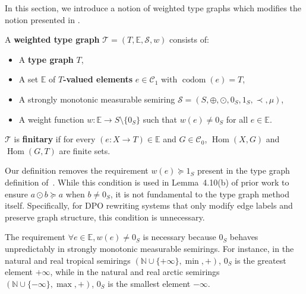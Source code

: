 In this section, we introduce a notion of weighted type graphs which modifies the notion presented in \cite{endrullis2024generalized}.

\begin{definition}
    \label{def:weighted_type_graph}
    A \textbf{weighted type graph} \(\mathcal{T} = (T, \mathbb{E}, \mathcal{S}, w)\) consists of:
    \begin{itemize}
        \item A \textbf{type graph} \(T\),
        \item A set \(\mathbb{E}\) of \textbf{\(T\)-valued elements} \(e \in \mathcal{C}_1\) with $\operatorname{codom}(e) = T$,
        \item A strongly monotonic measurable semiring \(\mathcal{S}=(S, \oplus, \odot, 0_S, 1_S, \prec, \mu)\),
        \item A weight function \(w : \mathbb{E} \to S \setminus \{0_S\}\) such that \(w(e) \neq 0_S\) for all \(e \in \mathbb{E}\).
    \end{itemize}
    \(\mathcal{T}\) is \textbf{finitary} if for every \((e:X \to T) \in \mathbb{E}\) and \(G \in \mathcal{C}_0\), \(\operatorname{Hom}(X, G)\) and \(\operatorname{Hom}(G, T)\) are finite sets.
\end{definition}

\begin{remark}
    \label{remark:greater_than_1}
    Our definition removes the requirement \(w(e) \succeq 1_S\) present in the type graph definition of~\cite{endrullis2024generalized}. While this condition is used in Lemma~4.10(b) of prior work to ensure \(a \odot b \succeq a\) when \(b \neq 0_S\), it is not fundamental to the type graph method itself. Specifically, for DPO rewriting systems that only modify edge labels and preserve graph structure, this condition is unnecessary.
\end{remark}

\begin{remark}
    \label{remark:semiring_0_unpredictable}
    The requirement \(\forall e \in \mathbb{E}, w(e) \neq 0_S\) is necessary because \(0_S\) behaves unpredictably in strongly monotonic measurable semirings. For instance, in the natural and real tropical semirings \((\mathbb{N} \cup \{+\infty\}, \min, +)\), \(0_S\) is the greatest element \(+\infty\), while in the natural and real arctic semirings \((\mathbb{N} \cup \{-\infty\}, \max, +)\), \(0_S\) is the smallest element \(-\infty\).
\end{remark}

